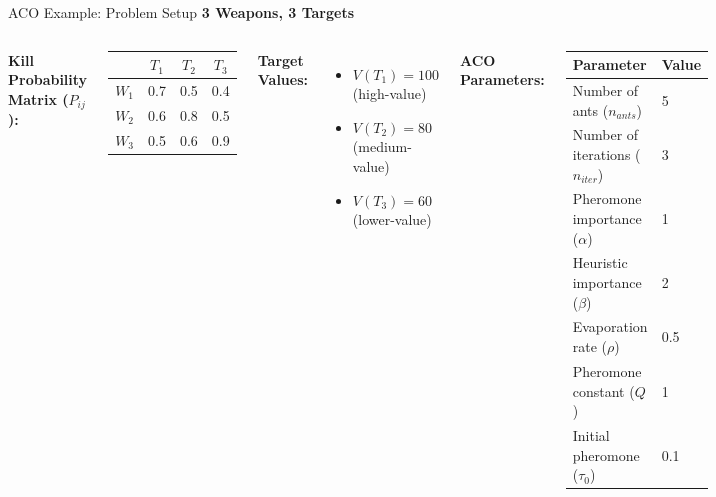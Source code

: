 \documentclass[aspectratio=43,8pt]{beamer}
\begin{document}
\begin{frame}{ACO Example: Problem Setup}
\textbf{3 Weapons, 3 Targets}

\vspace{0.2cm}
\begin{columns}
\textbf{Kill Probability Matrix ($P_{ij}$):}
\begin{center}
\begin{tabular}{c|ccc}
\toprule
& $T_1$ & $T_2$ & $T_3$ \\
\midrule
$W_1$ & 0.7 & 0.5 & 0.4 \\
$W_2$ & 0.6 & 0.8 & 0.5 \\
$W_3$ & 0.5 & 0.6 & 0.9 \\
\bottomrule
\end{tabular}
\end{center}

\vspace{0.3cm}
\textbf{Target Values:}
\begin{itemize}
    \item $V(T_1) = 100$ (high-value)
    \item $V(T_2) = 80$ (medium-value)
    \item $V(T_3) = 60$ (lower-value)
\end{itemize}

\textbf{ACO Parameters:}
\begin{center}
\begin{tabular}{ll}
\toprule
\textbf{Parameter} & \textbf{Value} \\
\midrule
Number of ants ($n_{ants}$) & 5 \\
Number of iterations ($n_{iter}$) & 3 \\
Pheromone importance ($\alpha$) & 1 \\
Heuristic importance ($\beta$) & 2 \\
Evaporation rate ($\rho$) & 0.5 \\
Pheromone constant ($Q$) & 1 \\
Initial pheromone ($\tau_0$) & 0.1 \\
\bottomrule
\end{tabular}
\end{center}
\end{columns}
\end{frame}
\end{document}
